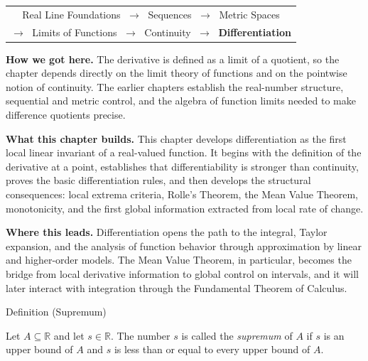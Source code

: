 \begin{tcolorbox}[colback=gray!6, colframe=gray!40, arc=2pt,
  left=8pt, right=8pt, top=6pt, bottom=6pt,
  title={\small\textbf{Differentiation}},
  fonttitle=\small\bfseries]

\begin{center}
\small
\begin{tabular}{c}
Real Line Foundations $\;\to\;$ Sequences $\;\to\;$ Metric Spaces \\[2pt]
$\to\;$ Limits of Functions $\;\to\;$ Continuity $\;\to\;$ \textbf{Differentiation}
\end{tabular}
\end{center}

\medskip
\noindent\textbf{How we got here.}
The derivative is defined as a limit of a quotient, so the chapter depends
directly on the limit theory of functions and on the pointwise notion of
continuity. The earlier chapters establish the real-number structure,
sequential and metric control, and the algebra of function limits needed to
make difference quotients precise.

\medskip
\noindent\textbf{What this chapter builds.}
This chapter develops differentiation as the first local linear invariant of a
real-valued function. It begins with the definition of the derivative at a
point, establishes that differentiability is stronger than continuity, proves
the basic differentiation rules, and then develops the structural consequences:
local extrema criteria, Rolle's Theorem, the Mean Value Theorem, monotonicity,
and the first global information extracted from local rate of change.

\medskip
\noindent\textbf{Where this leads.}
Differentiation opens the path to the integral, Taylor expansion, and the
analysis of function behavior through approximation by linear and higher-order
models. The Mean Value Theorem, in particular, becomes the bridge from local
derivative information to global control on intervals, and it will later
interact with integration through the Fundamental Theorem of Calculus.

\end{tcolorbox}




\begin{definitionbox}{Definition (Supremum)}
\begin{definition}
\label{def:supremum}
Let $A \subseteq \mathbb{R}$ and let $s \in \mathbb{R}$. The number $s$ is called the
\emph{supremum} of $A$ if $s$ is an upper bound of $A$ and $s$ is less than or equal to
every upper bound of $A$.
\end{definition}
\end{definitionbox}

